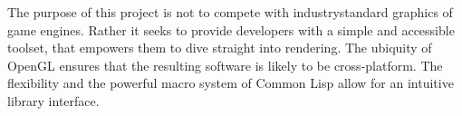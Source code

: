 The purpose of this project is not to compete with industry\-standard graphics of game engines.
Rather it seeks to provide developers with a simple and accessible toolset,
that empowers them to dive straight into rendering.
The ubiquity of OpenGL ensures that the resulting software is likely to be cross-platform\cite{khronos}.
The flexibility and the powerful macro system of Common Lisp allow for an intuitive library interface\cite{practical_cl}.
